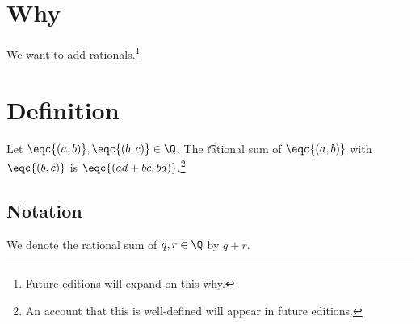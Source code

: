 

\section*{Why}

We want to add rationals.\footnote{Future editions will expand on this why.}

\section*{Definition}

Let $\eqc{(a, b)}, \eqc{(b, c)} \in \Q $.
The \t{rational sum} of $\eqc{(a, b)}$ with $\eqc{(b, c)}$ is $\eqc{(ad + bc, bd)}$.\footnote{An account that this is well-defined will appear in future editions.}

\subsection*{Notation}

We denote the rational sum of $q, r \in \Q $ by $q + r$.

\blankpage
